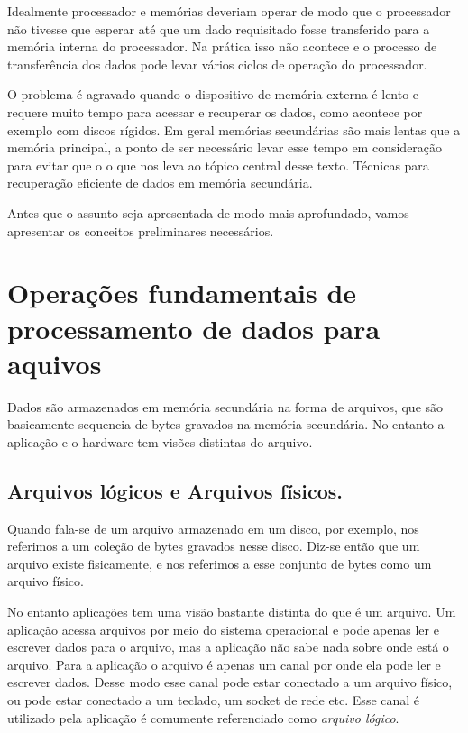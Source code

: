 \documentclass[a4paper,11pt]{book}
\begin{document}
   Idealmente processador e memórias deveriam operar de modo que o processador não tivesse que esperar até que um dado requisitado 
   fosse transferido para a memória interna do processador. Na prática isso não acontece e o processo de transferência dos dados
   pode levar vários ciclos de operação do processador.
   
   O problema é agravado quando o dispositivo de memória externa é lento e requere muito tempo para acessar e recuperar os dados, como
   acontece por exemplo com discos rígidos. Em geral memórias secundárias são mais lentas que a memória principal, a ponto
   de ser necessário levar esse tempo em consideração para evitar  que o  o que nos leva ao tópico
   central desse texto. Técnicas para recuperação eficiente de dados em memória secundária. 
   
   
   Antes que o assunto seja apresentada de modo mais aprofundado, vamos apresentar os conceitos preliminares necessários. 
   
   
   \section{Operações fundamentais de processamento de dados para aquivos}
   
   Dados são armazenados em memória secundária na forma de arquivos, que são basicamente sequencia de bytes gravados na memória
   secundária. No entanto a aplicação e o hardware tem visões distintas do arquivo.
   
   \subsection{Arquivos lógicos e Arquivos físicos.}
   
   Quando fala-se de um arquivo armazenado em um disco, por exemplo, nos referimos a um coleção de bytes gravados nesse disco. Diz-se então 
   que um arquivo existe fisicamente, e nos referimos a esse conjunto de bytes como um arquivo físico.
   
   No entanto aplicações tem uma visão bastante distinta do que é um arquivo. Um aplicação acessa arquivos por meio do sistema operacional
   e pode apenas ler e escrever dados para o arquivo, mas a aplicação não sabe nada sobre onde está o arquivo. Para a aplicação
   o arquivo é apenas um canal por onde ela pode ler e escrever dados. Desse modo esse canal pode estar conectado a um arquivo físico,
   ou pode estar conectado a um teclado, um socket de rede etc.  Esse canal é utilizado pela aplicação é comumente referenciado 
   como \emph{arquivo lógico}. 
   
\end{document}
